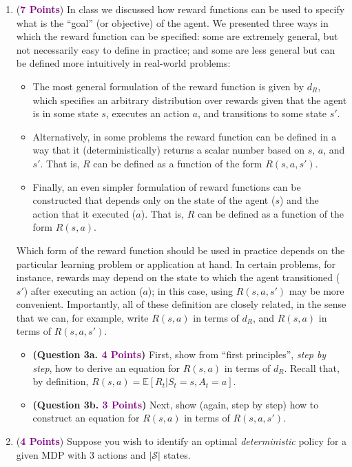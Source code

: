 \documentclass{article}
\newcommand{\POINTS}[1]{\textcolor{purple}{\textbf{{#1}}}}
\begin{document}
\begin{enumerate}
    \item (\POINTS{7 Points}) In class we discussed how reward functions can be used to specify what is the ``goal'' (or objective) of the agent. We presented three ways in which the reward function can be specified: some are extremely general, but not necessarily easy to define in practice; and some are less general but can be defined more intuitively in real-world problems:
    \begin{itemize}
        \item The most general formulation of the reward function is given by $d_R$, which specifies an arbitrary distribution over rewards given that the agent is in some state $s$, executes an action $a$, and transitions to some state $s'$.
        \item Alternatively, in some problems the reward function can be defined in a way that it (deterministically) returns a scalar number based on $s$, $a$, and $s'$. That is, $R$ can be defined as a function of the form $R(s,a,s')$.
        \item Finally, an even simpler formulation of reward functions can be constructed that depends only on the state of the agent ($s$) and the action that it executed ($a$). That is, $R$ can be defined as a function of the form $R(s,a)$.
    \end{itemize}
    Which form of the reward function should be used in practice depends on the particular learning problem or application at hand. In certain problems, for instance, rewards may depend on the state to which the agent transitioned ($s'$) after executing an action ($a$); in this case, using $R(s,a,s')$ may be more convenient. Importantly, all of these definition are closely related, in the sense that we can, for example, write $R(s,a)$ in terms of $d_R$, and $R(s,a)$ in terms of $R(s,a,s')$. 
    \begin{itemize}
        \item \textbf{(Question 3a. \POINTS{4 Points})} First, show from ``first principles'', \textit{step by step}, how to derive an equation for $R(s,a)$ in terms of $d_R$. Recall that, by definition, $R(s,a) = \mathbb E[R_t | S_t = s, A_t = a]$.
        \item \textbf{(Question 3b. \POINTS{3 Points})} Next, show (again, step by step) how to construct an equation for $R(s,a)$ in terms of $R(s,a,s')$.
    \end{itemize}
    \item (\POINTS{4 Points}) Suppose you wish to identify an optimal \textit{deterministic} policy for a given MDP with 3 actions and $|\mathcal S|$ states. 

\end{enumerate}
\end{document}
